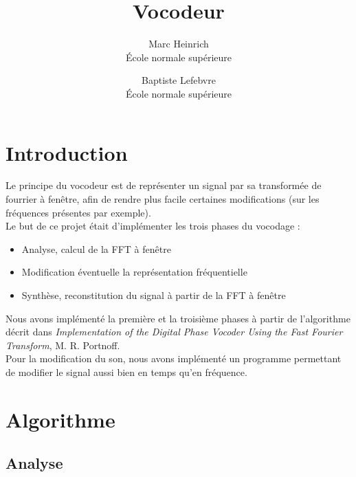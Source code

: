 \documentclass[a4paper,11pt]{article}
\title{Vocodeur}
\author{ Marc Heinrich \\ \'Ecole normale supérieure \and Baptiste Lefebvre \\ \'Ecole normale supérieure}
\begin{document}
\maketitle

\section{Introduction}

Le principe du vocodeur est de représenter un signal par sa transformée de fourrier à fenêtre, afin de rendre plus facile certaines modifications (sur les fréquences présentes par exemple). \\
Le but de ce projet était d'implémenter les trois phases du vocodage : 
\begin{itemize}
	\item Analyse, calcul de la FFT à fenêtre
	\item Modification éventuelle la représentation fréquentielle
	\item Synthèse, reconstitution du signal à partir de la FFT à fenêtre
\end{itemize}
Nous avons implémenté la première et la troisième phases à partir de l'algorithme décrit dans \emph{Implementation of the Digital Phase Vocoder Using the Fast Fourier Transform}, M. R. Portnoff. \\
Pour la modification du son, nous avons implémenté un programme permettant de modifier le signal aussi bien en temps qu'en fréquence.

\section{Algorithme}

\subsection{Analyse}
\end{document}
